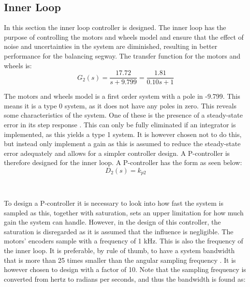 \subsection{Inner Loop}
In this section the inner loop controller is designed. The inner loop has the purpose of controlling the motors and wheels model and ensure that the effect of noise and uncertainties in the system are diminished, resulting in better performance for the balancing segway.\newpage
The transfer function for the motors and wheels is:
\begin{equation}
G_2(s)=\frac{17.72}{s+9.799} = \frac{1.81}{0.10s + 1}
\end{equation}
\begin{where}
\end{where}

The motors and wheels model is a first order system with a pole in -9.799. This means it is a type 0 system, as it does not have any poles in zero. This reveals some characteristics of the system. One of these is the presence of a steady-state error in its step response \citep[p. 211]{sou:Feedback}. This can only be fully eliminated if an integrator is implemented, as this yields a type 1 system. It is however chosen not to do this, but instead only implement a gain as this is assumed to reduce the steady-state error adequately and allows for a simpler controller design. A P-controller is therefore designed for the inner loop. A P-controller has the form as seen below:
\begin{equation}
D_2(s)=k_{p2}
\end{equation}
\begin{where}
\\
\end{where}

To design a P-controller it is necessary to look into how fast the system is sampled as this, together with saturation, sets an upper limitation for how much gain the system can handle. However, in the design of this controller, the saturation is disregarded as it is assumed that the influence is negligible. The motors' encoders sample with a frequency of 1 kHz. This is also the frequency of the inner loop. It is preferable, by rule of thumb, to have a system bandwidth that is more than 25 times smaller than the angular sampling frequency \citep[p. 613]{sou:Feedback}. It is however chosen to design with a factor of 10. Note that the sampling frequency is converted from hertz to radians per seconds, and thus the bandwidth is found as:

